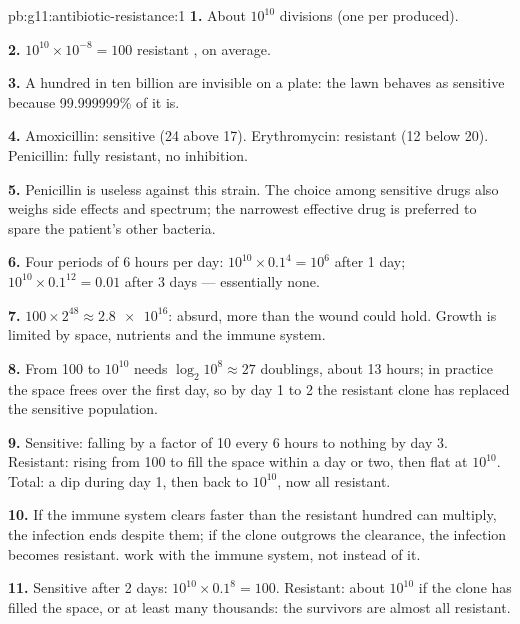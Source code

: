 \begin{solution}{pb:g11:antibiotic-resistance:1}
\textbf{1.} About $10^{10}$ divisions (one per  produced).

\textbf{2.} $10^{10} \times 10^{-8} = 100$ resistant , on average.

\textbf{3.} A hundred  in ten billion are invisible on a plate:
the lawn behaves as sensitive because 99.999999\% of it is.

\textbf{4.} Amoxicillin: sensitive (24 above 17). Erythromycin:
resistant (12 below 20). Penicillin: fully resistant, no inhibition.

\textbf{5.} Penicillin is useless against this strain. The choice
among sensitive drugs also weighs side effects and spectrum; the
narrowest effective drug is preferred to spare the patient's other
bacteria.

\textbf{6.} Four periods of 6 hours per day: $10^{10} \times 0.1^4 =
10^6$ after 1 day; $10^{10} \times 0.1^{12} = 0.01$ after 3 days ---
essentially none.

\textbf{7.} $100 \times 2^{48} \approx \num{2.8e16}$: absurd, more than
the wound could hold. Growth is limited by space, nutrients and the
immune system.

\textbf{8.} From 100  to $10^{10}$ needs $\log_2 10^8 \approx 27$
doublings, about 13 hours; in practice the space frees over the first
day, so by day 1 to 2 the resistant clone has replaced the sensitive
population.

\textbf{9.} Sensitive: falling by a factor of 10 every 6 hours to
nothing by day 3. Resistant: rising from 100 to fill the space within
a day or two, then flat at $10^{10}$. Total: a dip during day 1, then
back to $10^{10}$, now all resistant.

\textbf{10.} If the immune system clears  faster than the
resistant hundred can multiply, the infection ends despite them; if
the clone outgrows the clearance, the infection becomes resistant.
 work with the immune system, not instead of it.

\textbf{11.} Sensitive after 2 days: $10^{10} \times 0.1^8 = 100$.
Resistant: about $10^{10}$ if the clone has filled the space, or at
least many thousands: the survivors are almost all resistant.


\end{solution}
